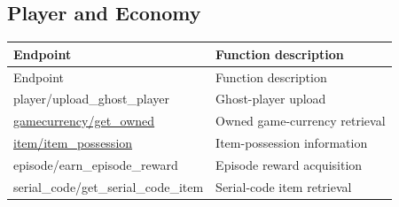 \subsection{Player and Economy}

\begin{longtable}{>{\ttfamily}p{}p{}}
\toprule
Endpoint & Function description \\
\midrule
\endfirsthead%

\toprule
Endpoint & Function description \\
\midrule
\endhead%

player/upload\_ghost\_player
    & Ghost-player upload \\

\hyperref[subsec:api_gamecurrency_get_owned]
    {gamecurrency/get\_owned}
    & Owned game-currency retrieval \\

\hyperref[subsec:api_item_item_possession]
    {item/item\_possession}
    & Item-possession information \\

episode/earn\_episode\_reward
    & Episode reward acquisition \\

serial\_code/get\_serial\_code\_item
    & Serial-code item retrieval \\

\bottomrule
\end{longtable}


\newpage